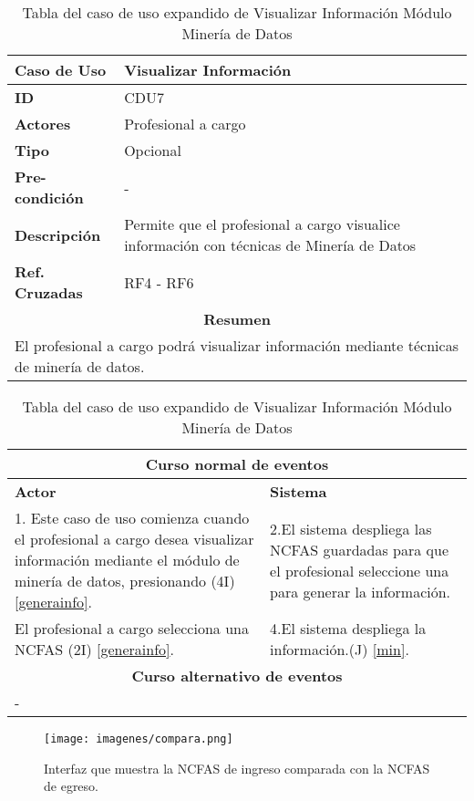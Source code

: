 \begin{table}
	\centering
	\begin{tabular}{|p{6cm} |p{6cm}|}
		\hline \textbf{Caso de Uso} & Visualizar Información \\ 
		\hline \textbf{ID} & CDU7 \\ 
		\hline \textbf{Actores} & Profesional a cargo \\ 
		\hline \textbf{Tipo} & Opcional \\ 
		\hline \textbf{Pre-condición} & - \\ 
		\hline \textbf{Descripción} & Permite que el profesional a cargo visualice información con técnicas de Minería de Datos \\
		\hline \textbf{Ref. Cruzadas} & RF4 - RF6 \\ 
		\hline
		\multicolumn{2}{|c|}{\textbf{Resumen}} \\
		\hline
		\multicolumn{2}{|p{12cm}|}{El profesional a cargo podrá visualizar información mediante técnicas de minería de datos.} \\
		\hline 
	\end{tabular}  
	\begin{tabular}{|p{6cm}|p{6cm}|}
		\multicolumn{2}{|c|}{\textbf{Curso normal de eventos}} \\
		\hline \textbf{Actor} & \textbf{Sistema} \\ 
		\hline 1. Este caso de uso comienza cuando el profesional a cargo desea visualizar información mediante el módulo de minería de datos, presionando (4I) \ref{generainfo}. & 2.El sistema despliega las NCFAS guardadas para que el profesional seleccione una para generar la información.  \\ 
	El profesional a cargo selecciona una NCFAS (2I) \ref{generainfo}. & 4.El sistema despliega la información.(J) \ref{min}. \\
		\hline
		\multicolumn{2}{|c|}{\textbf{Curso alternativo de eventos}} \\
		\hline
		\multicolumn{2}{|p{12cm}|}{ - } \\
		\hline
	\end{tabular}
	\caption{Tabla del caso de uso expandido de Visualizar Información Módulo Minería de Datos}
	\label{tabcdu77}
\end{table}
\clearpage


\begin{figure}[h!]
	\label{compara}
	\begin{center}
		\texttt{[image: imagenes/compara.png]}
	\end{center}
	\caption{Interfaz que muestra la NCFAS de ingreso comparada con la NCFAS de egreso.}
\end{figure}

